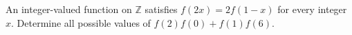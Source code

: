 An integer-valued function on $\mathbb Z $ satisfies $ f(2x)=2f(1-x)$ for every integer $ x $. Determine all possible values of $ f(2)f(0)+f(1)f(6)$.
